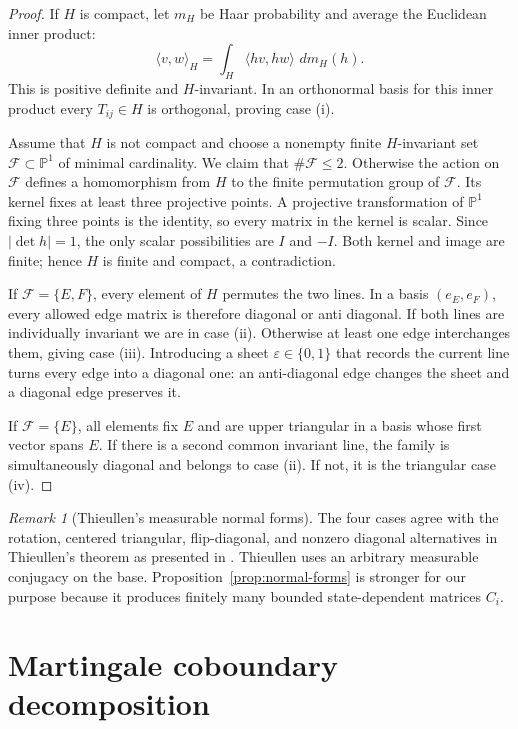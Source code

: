 \documentclass[11pt,a4paper]{amsart}
\theoremstyle{definition}
\theoremstyle{remark}
\newtheorem{remark}[theorem]{Remark}
\numberwithin{equation}{section}
\newcommand{\PP}{\mathbb P}
\newcommand{\dd}{\,d}
\newcommand{\1}{\boldsymbol 1}
\begin{document}
\begin{proof}
If $H$ is compact, let $m_H$ be Haar probability and average the
Euclidean inner product:
$$
 \langle v,w\rangle_H
 =\int_H\langle hv,hw\rangle\,\dd m_H(h).
$$
This is positive definite and $H$-invariant.  In an orthonormal basis
for this inner product every $T_{ij}\in H$ is orthogonal, proving
case \textup{(i)}.

Assume that $H$ is not compact and choose a nonempty finite
$H$-invariant set $\mathcal F\subset\PP^1$ of minimal cardinality.
We claim that $\#\mathcal F\le2$.  Otherwise the action on
$\mathcal F$ defines a homomorphism from $H$ to the finite
permutation group of $\mathcal F$.  Its kernel fixes at least three
projective points.  A projective transformation of $\PP^1$ fixing
three points is the identity, so every matrix in the kernel is scalar.
Since $|\det h|=1$, the only scalar possibilities are $I$ and
$-I$.  Both kernel and image are finite; hence $H$ is finite and
compact, a contradiction.

If $\mathcal F=\{E,F\}$, every element of $H$ permutes the two
lines.  In a basis $(e_E,e_F)$, every allowed edge matrix is therefore
diagonal or anti diagonal.  If both lines are individually invariant we
are in case \textup{(ii)}.  Otherwise at least one edge interchanges
them, giving case \textup{(iii)}.  Introducing a sheet
$\varepsilon\in\{0,1\}$ that records the current line turns every
edge into a diagonal one: an anti-diagonal edge changes the sheet and a
diagonal edge preserves it.

If $\mathcal F=\{E\}$, all elements fix $E$ and are upper
triangular in a basis whose first vector spans $E$.  If there is a
second common invariant line, the family is simultaneously diagonal and
belongs to case \textup{(ii)}.  If not, it is the triangular
case \textup{(iv)}. %
\end{proof}

\begin{remark}[Thieullen's measurable normal forms]
The four cases agree with the rotation, centered triangular,
flip-diagonal, and nonzero diagonal alternatives in Thieullen's theorem
as presented in \cite[Theorem~6.12]{Viana}.  Thieullen uses an arbitrary
measurable conjugacy on the base.  Proposition~\ref{prop:normal-forms}
is stronger for our purpose because it produces finitely many bounded
state-dependent matrices $C_i$.
\end{remark}
\section{Martingale coboundary decomposition}
\label{sec:additive}
\end{document}
